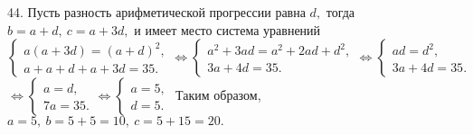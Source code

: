 44. Пусть разность арифметической прогрессии равна $d,$ тогда $b=a+d,\ c=a+3d,$ и имеет место система уравнений
$\begin{cases} a(a+3d)=(a+d)^2,\\ a+a+d+a+3d=35.\end{cases}\Leftrightarrow\begin{cases} a^2+3ad=a^2+2ad+d^2,\\ 3a+4d=35.\end{cases}\Leftrightarrow
\begin{cases} ad=d^2,\\ 3a+4d=35.\end{cases}$\\$\Leftrightarrow\begin{cases} a=d,\\ 7a=35.\end{cases}
\Leftrightarrow\begin{cases} a=5,\\ d=5.\end{cases}$ Таким образом, $a=5,\ b=5+5=10,\ c=5+15=20.$\\
